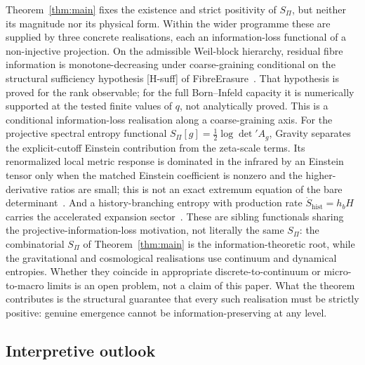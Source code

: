 \documentclass[12pt,a4paper]{article}
\begin{document}
  Theorem~\ref{thm:main} fixes the existence and strict positivity of $S_\Pi$, but neither its magnitude nor its
  physical form.
  Within the wider programme these are supplied by three concrete realisations, each an information-loss
  functional of a non-injective projection.
  On the admissible Weil-block hierarchy, residual fibre information is monotone-decreasing under
  coarse-graining conditional on the structural sufficiency hypothesis [H-suff] of
  FibreErasure~\citep{Beau2026fe}.
  That hypothesis is proved for the rank observable; for the full Born--Infeld capacity it is numerically
  supported at the tested finite values of $q$, not analytically proved.
  This is a conditional information-loss realisation along a coarse-graining axis.
  For the projective spectral entropy functional $S_\Pi[g] = \tfrac{1}{2}\log\det' A_g$, Gravity separates
  the explicit-cutoff Einstein contribution from the zeta-scale terms.
  Its renormalized local metric response is dominated in the infrared by an Einstein tensor only when the
  matched Einstein coefficient is nonzero and the higher-derivative ratios are small; this is not an exact
  extremum equation of the bare determinant~\citep{Beau2026h,Beau2026Thermodynamics}.
  And a history-branching entropy with production rate $\dot S_{\mathrm{hist}} = h_b H$ carries the accelerated
  expansion sector~\citep{Beau2026d}.
  These are sibling functionals sharing the projective-information-loss motivation, not literally the same
  $S_\Pi$: the combinatorial $S_\Pi$ of Theorem~\ref{thm:main} is the information-theoretic root, while the
  gravitational and cosmological realisations use continuum and dynamical entropies.
  Whether they coincide in appropriate discrete-to-continuum or micro-to-macro limits is an open problem, not a
  claim of this paper.
  What the theorem contributes is the structural guarantee that every such realisation must be strictly
  positive: genuine emergence cannot be information-preserving at any level.

  \subsection*{Interpretive outlook}
\end{document}
